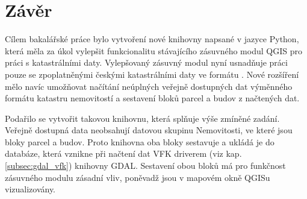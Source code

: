 \chapter{Závěr}
\label{5-zaver}

Cílem bakalářské práce bylo vytvoření nové knihovny napsané v jazyce
Python, která měla za úkol vylepšit funkcionalitu stávajícího
zásuvného modul QGIS pro práci s katastrálními daty. Vylepšovaný
zásuvný modul nyní usnadňuje práci pouze se zpoplatněnými českými
katastrálními daty ve formátu . Nové rozšíření mělo navíc
umožňovat načítání neúplných veřejně dostupných dat výměnného formátu
katastru nemovitostí a sestavení bloků parcel a budov z načtených dat.

Podařilo se vytvořit takovou knihovnu, která
splňuje výše zmíněné zadání.
Veřejně dostupná data neobsahují datovou skupinu Nemovitosti, ve které
jsou bloky parcel a budov. Proto knihovna oba bloky sestavuje
a ukládá je do databáze, která vznikne při načtení dat VFK driverem
(viz kap. \ref{subsec:gdal_vfk}) knihovny GDAL. Sestavení obou bloků
má pro funkčnost zásuvného modulu zásadní vliv, poněvadž jsou v
mapovém okně QGISu vizualizovány.

